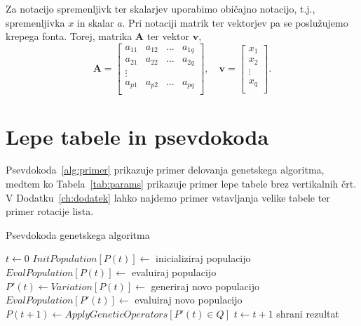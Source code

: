 \documentclass[a4paper, 12pt]{book}
\begin{document}
Za notacijo spremenljivk ter skalarjev uporabimo običajno notacijo, t.j., spremenljivka $x$ in skalar $a$. Pri notaciji matrik ter vektorjev pa se poslužujemo krepega fonta. Torej, matrika $\boldsymbol{A}$ ter vektor $\boldsymbol{v}$,
\begin{equation}
\boldsymbol{A} = \begin{bmatrix}
       a_{11} & a_{12} & \dots & a_{1q}  \\
       a_{21} & a_{22} & \dots & a_{2q}  \\
       \vdots  \\
       a_{p1} & a_{p2} & \dots & a_{pq}  \\
     \end{bmatrix}, \quad
     \boldsymbol{v} = \begin{bmatrix}
       x_1  \\
       x_2  \\
       \vdots  \\
       x_q  \\
     \end{bmatrix}. \nonumber
\end{equation}

\section{Lepe tabele in psevdokoda}
\label{sec:psevdokoda}

Psevdokoda~\ref{alg:primer} prikazuje primer delovanja genetskega algoritma, medtem ko Tabela~\ref{tab:params} prikazuje primer lepe tabele brez vertikalnih črt. V Dodatku~\ref{ch:dodatek} lahko najdemo primer vstavljanja velike tabele ter primer rotacije lista.

\begin{algorithm}
\caption{Psevdokoda genetskega algoritma}
\label{alg:primer}
\begin{algorithmic}[1]
\footnotesize
\STATE $t \gets 0$
\STATE $InitPopulation[P(t)] \gets$ inicializiraj populacijo
\STATE $EvalPopulation[P(t)] \gets$ evaluiraj populacijo
\REPEAT
\STATE $P'(t) \gets Variation[P(t)] \gets $ generiraj novo populacijo
\STATE $EvalPopulation[P'(t)] \gets$ evaluiraj novo populacijo
\STATE $P(t+1) \gets ApplyGeneticOperators[P'(t) \in Q]$
\STATE $t \gets t+1$
\STATE shrani rezultat
\ENDIF
\end{algorithmic}
\end{algorithm}
\end{document}
